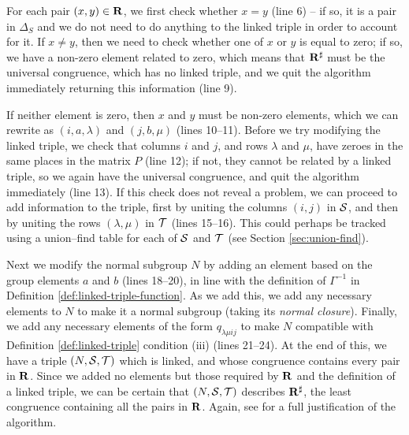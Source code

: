 For each pair $(x,y) \in \mathbf{R}$, we first check whether $x=y$ (line 6) -- if so, it
is a pair in $\Delta_S$ and we do not need to do anything to the linked triple
in order to account for it.  If $x \neq y$, then we need to check whether one of
$x$ or $y$ is equal to zero; if so, we have a non-zero element related to zero,
which means that $\mathbf{R}^\sharp$ must be the universal congruence, which has no linked
triple, and we quit the algorithm immediately returning this information (line
9).

If neither element is zero, then $x$ and $y$ must be non-zero elements, which we
can rewrite as $(i,a,\lambda)$ and $(j,b,\mu)$ (lines 10--11).  Before we try
modifying the linked triple, we check that columns $i$ and $j$, and rows
$\lambda$ and $\mu$, have zeroes in the same places in the matrix $P$ (line 12);
if not, they cannot be related by a linked triple, so we again have the
universal congruence, and quit the algorithm immediately (line 13).  If this
check does not reveal a problem, we can proceed to add information to the
triple, first by uniting the columns $(i,j)$ in $\mathcal{S}$, and then by uniting the
rows $(\lambda, \mu)$ in $\mathcal{T}$ (lines 15--16).  This could perhaps be tracked
using a union--find table for each of $\mathcal{S}$ and $\mathcal{T}$ (see Section
\ref{sec:union-find}).

Next we modify the normal subgroup $N$ by adding an element based on the group
elements $a$ and $b$ (lines 18--20), in line with the definition of
$\Gamma^{-1}$ in Definition \ref{def:linked-triple-function}.  As we add this,
we add any necessary elements to $N$ to make it a normal subgroup (taking its
\textit{normal closure}).  Finally, we add any necessary elements of the
form $q_{\lambda \mu i j}$ to make $N$ compatible with Definition
\ref{def:linked-triple} condition (iii) (lines 21--24).  At the end of this, we
have a triple $(N,\mathcal{S},\mathcal{T})$ which is linked, and whose congruence contains every
pair in $\mathbf{R}$.  Since we added no elements but those required by $\mathbf{R}$ and the
definition of a linked triple, we can be certain that $(N,\mathcal{S},\mathcal{T})$ describes
$\mathbf{R}^\sharp$, the least congruence containing all the pairs in $\mathbf{R}$.  Again, see
\cite[\S 3.2]{mtorpey_msc} for a full justification of the algorithm.


